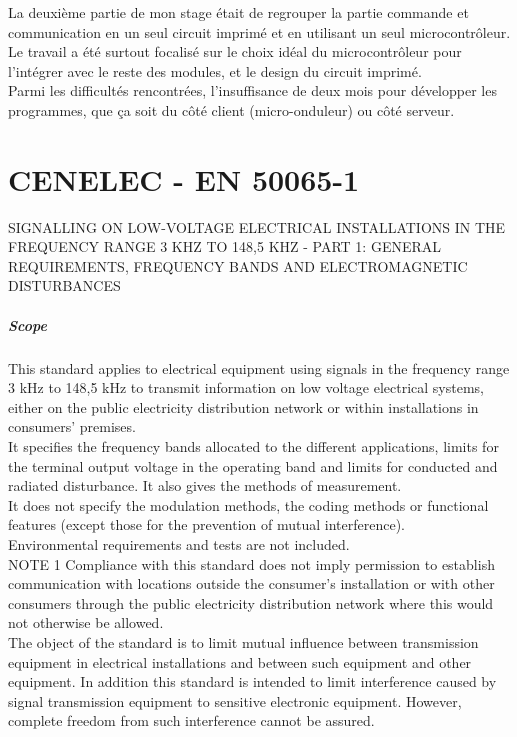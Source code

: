 \documentclass[11pt, a4paper, twoside]{book}
\begin{document}
La deuxième partie de mon stage était de regrouper la partie commande et communication en un seul circuit imprimé et en utilisant un seul microcontrôleur. Le travail a été surtout focalisé sur le choix idéal du microcontrôleur pour l'intégrer avec le reste des modules, et le design du circuit imprimé.\\

Parmi les difficultés rencontrées, l'insuffisance de deux mois pour développer les programmes, que ça soit du côté client (micro-onduleur) ou côté serveur.

\appendix
\chapter{CENELEC - EN 50065-1}
SIGNALLING ON LOW-VOLTAGE ELECTRICAL INSTALLATIONS IN THE FREQUENCY RANGE 3 KHZ TO 148,5 KHZ - PART 1: GENERAL REQUIREMENTS, FREQUENCY BANDS AND ELECTROMAGNETIC DISTURBANCES\\

\paragraph{Scope}
This standard applies to electrical equipment using signals in the frequency range 3 kHz to 148,5 kHz to transmit information on low voltage electrical systems, either on the public electricity distribution network or within installations in consumers' premises.\\

It specifies the frequency bands allocated to the different applications, limits for the terminal output voltage in the operating band and limits for conducted and radiated disturbance. It also gives the methods of measurement.\\

It does not specify the modulation methods, the coding methods or functional features (except those for the prevention of mutual interference).\\

Environmental requirements and tests are not included.\\

NOTE 1 Compliance with this standard does not imply permission to establish communication with locations outside the consumer's installation or with other consumers through the public electricity distribution network where this would not otherwise be allowed.\\

The object of the standard is to limit mutual influence between transmission equipment in electrical installations and between such equipment and other equipment. In addition this standard is intended to limit interference caused by signal transmission equipment to sensitive electronic equipment. However, complete freedom from such interference cannot be assured.\\
\end{document}
